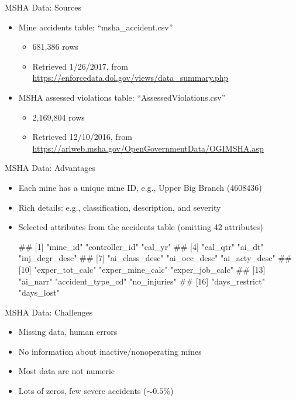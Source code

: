 \documentclass[]{beamer}
\providecommand{\tightlist}{%
  \setlength{\itemsep}{0pt}\setlength{\parskip}{0pt}}
\let\oldverbatim\verbatim
\let\endoldverbatim\endverbatim
\renewenvironment{verbatim}{\footnotesize\oldverbatim}{\endoldverbatim}
\begin{document}
\begin{frame}{MSHA Data: Sources}

\begin{itemize}[<+->]
\tightlist
\item
  Mine accidents table: ``msha\_accident.csv''

  \begin{itemize}[<+->]
  \tightlist
  \item
    681,386 rows
  \item
    Retrieved 1/26/2017, from
    \url{https://enforcedata.dol.gov/views/data_summary.php}
  \end{itemize}
\item
  MSHA assessed violations table: ``AssessedViolations.csv''

  \begin{itemize}[<+->]
  \tightlist
  \item
    2,169,804 rows
  \item
    Retrieved 12/10/2016, from
    \url{https://arlweb.msha.gov/OpenGovernmentData/OGIMSHA.asp}
  \end{itemize}
\end{itemize}

\end{frame}

\begin{frame}[fragile]{MSHA Data: Advantages}

\begin{itemize}[<+->]
\tightlist
\item
  Each mine has a unique mine ID, e.g., Upper Big Branch (4608436)
\item
  Rich details: e.g., classification, description, and severity
\item
  Selected attributes from the accidents table (omitting 42 attributes)

\begin{verbatim}
##  [1] "mine_id"          "controller_id"    "cal_yr"          
##  [4] "cal_qtr"          "ai_dt"            "inj_degr_desc"   
##  [7] "ai_class_desc"    "ai_occ_desc"      "ai_acty_desc"    
## [10] "exper_tot_calc"   "exper_mine_calc"  "exper_job_calc"  
## [13] "ai_narr"          "accident_type_cd" "no_injuries"     
## [16] "days_restrict"    "days_lost"
\end{verbatim}
\end{itemize}
\end{frame}

\begin{frame}{MSHA Data: Challenges}

\begin{itemize}[<+->]
\tightlist
\item
  Missing data, human errors
\item
  No information about inactive/nonoperating mines
\item
  Most data are not numeric
\item
  Lots of zeros, few severe accidents (\(\sim0.5\%\))
\end{itemize}

\end{frame}
\end{document}
